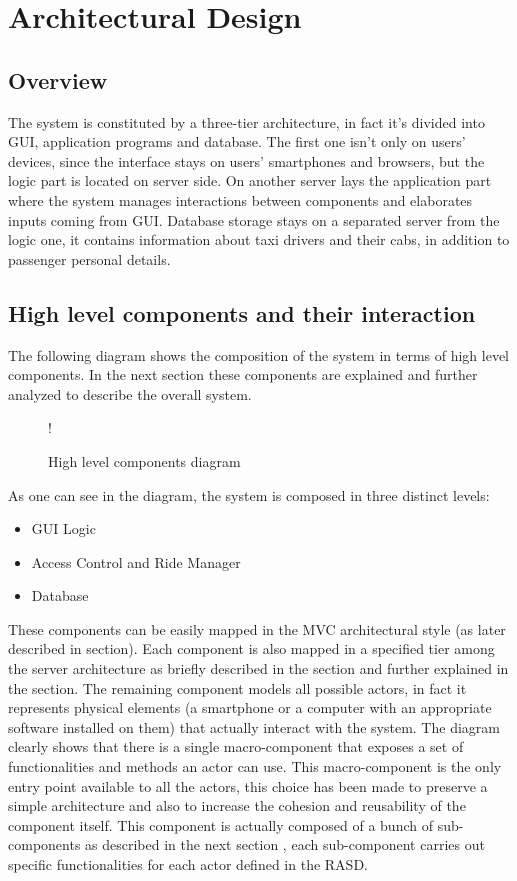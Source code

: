 \break
\section{Architectural Design}
\subsection{Overview}
\label{sec:overview}
The system is constituted by a three-tier architecture, in fact it's divided into GUI, application programs and database. The first one isn't only on users' devices, since the interface stays on users' smartphones and browsers, but the logic part is located on server side. On another server lays the application part where the system manages interactions between components and elaborates inputs coming from GUI. Database storage stays on a separated server from the logic one, it contains information about taxi drivers and their cabs, in addition to passenger personal details.  
\subsection{High level components and their interaction}
\label{sec:high-level}
The following diagram shows the composition of the system in terms of high level components. \newline
In the next section these components are explained and further analyzed to describe the overall system.
\begin{figure}[H]
	\centering
	\resizebox{6in}
	{!}{}
	\caption{High level components diagram}
\end{figure}
As one can see in the diagram, the system is composed in three distinct levels:
\begin{itemize}
	\item GUI Logic
	\item Access Control and Ride Manager
	\item Database
\end{itemize}
These components can be easily mapped in the MVC architectural style (as later described in  section).
Each component is also mapped in a specified tier among the server architecture as briefly described in the  section and further explained in the  section.
The remaining component models all possible actors, in fact it represents physical elements (a smartphone or a computer with an appropriate software installed on them) that actually interact with the system. \newline
The diagram clearly shows that there is a single macro-component that exposes a set of functionalities and methods an actor can use. This macro-component is the only entry point available to all the actors, this choice has been made to preserve a simple architecture and also to increase the cohesion and reusability of the component itself. \newline
This component is actually composed of a bunch of sub-components as described in the next section , each sub-component carries out specific functionalities for each actor defined in the RASD.

